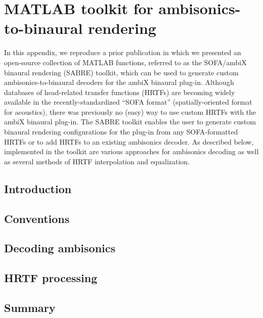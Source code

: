 \chapter{MATLAB toolkit for ambisonics-to-binaural rendering}\label{chap:A2_SABRE_Toolkit}
In this appendix, we reproduce a prior publication \citep{TylkaChoueiri2017b} in which we presented an open-source collection of MATLAB functions, referred to as the SOFA/ambiX binaural rendering (SABRE) toolkit, which can be used to generate custom ambisonics-to-binaural decoders for the ambiX binaural plug-in.
Although databases of head-related transfer functions (HRTFs) are becoming widely available in the recently-standardized  ``SOFA format'' (spatially-oriented format for acoustics), there was previously no (easy) way to use custom HRTFs with the ambiX binaural plug-in.
The SABRE toolkit enables the user to generate custom binaural rendering configurations for the plug-in from any SOFA-formatted HRTFs or to add HRTFs to an existing ambisonics decoder.
As described below, implemented in the toolkit are various approaches for ambisonics decoding as well as several methods of HRTF interpolation and equalization.

\section{Introduction}\label{sec:A2_SABRE_Toolkit:Introduction}


\section{Conventions}\label{sec:A2_SABRE_Toolkit:Conventions}


\section{Decoding ambisonics}\label{sec:A2_SABRE_Toolkit:Decoding_Ambisonics}


\section{HRTF processing}\label{sec:A2_SABRE_Toolkit:HRTF_Processing}


\section{Summary}\label{sec:A2_SABRE_Toolkit:Summary}


